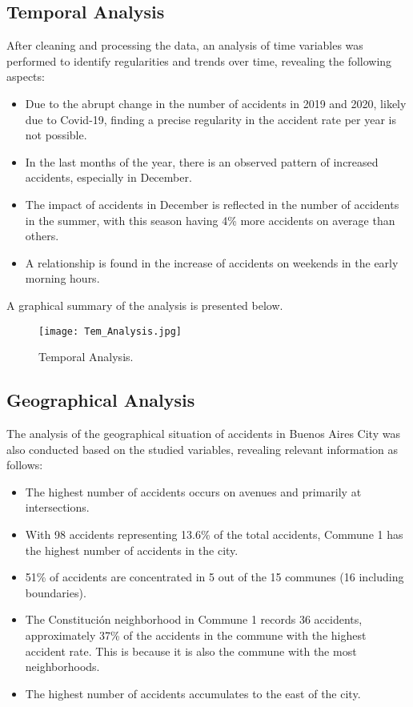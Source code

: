 \documentclass[12pt]{article}
\begin{document}
\subsection{Temporal Analysis}
After cleaning and processing the data, an analysis of time variables was performed to identify regularities and trends over time, revealing the following aspects:
\begin{itemize}
    \item Due to the abrupt change in the number of accidents in 2019 and 2020, likely due to Covid-19, finding a precise regularity in the accident rate per year is not possible.
    
    \item In the last months of the year, there is an observed pattern of increased accidents, especially in December.
    
    \item The impact of accidents in December is reflected in the number of accidents in the summer, with this season having 4\% more accidents on average than others.
    
    \item A relationship is found in the increase of accidents on weekends in the early morning hours.
\end{itemize}

A graphical summary of the analysis is presented below.

\begin{figure}[H]
  \centering
  \texttt{[image: Tem\_Analysis.jpg]}
  \caption{Temporal Analysis.}
  \label{fig:tem-analysis}
\end{figure}

\subsection{Geographical Analysis}
The analysis of the geographical situation of accidents in Buenos Aires City was also conducted based on the studied variables, revealing relevant information as follows:
\begin{itemize}
    \item The highest number of accidents occurs on avenues and primarily at intersections.
    
    \item With 98 accidents representing 13.6\% of the total accidents, Commune 1 has the highest number of accidents in the city.
    
    \item 51\% of accidents are concentrated in 5 out of the 15 communes (16 including boundaries).
    
    \item The Constitución neighborhood in Commune 1 records 36 accidents, approximately 37\% of the accidents in the commune with the highest accident rate. This is because it is also the commune with the most neighborhoods.
    
    \item The highest number of accidents accumulates to the east of the city.
\end{itemize}
\end{document}
